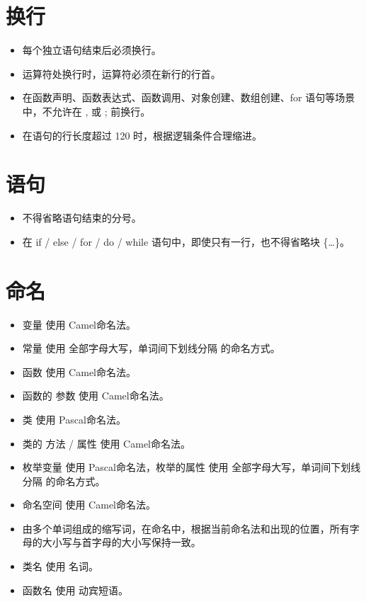 \documentclass[]{report}
\providecommand{\tightlist}{%
  \setlength{\itemsep}{0pt}\setlength{\parskip}{0pt}}
\begin{document}
\hypertarget{ux6362ux884c}{%
\section{换行}\label{ux6362ux884c}}

\begin{itemize}
\tightlist
\item
  每个独立语句结束后必须换行。
\item
  运算符处换行时，运算符必须在新行的行首。
\item
  在函数声明、函数表达式、函数调用、对象创建、数组创建、for
  语句等场景中，不允许在 , 或 ; 前换行。
\item
  在语句的行长度超过 120 时，根据逻辑条件合理缩进。
\end{itemize}

\hypertarget{ux8bedux53e5}{%
\section{语句}\label{ux8bedux53e5}}

\begin{itemize}
\tightlist
\item
  不得省略语句结束的分号。
\item
  在 if / else / for / do / while 语句中，即使只有一行，也不得省略块
  \{\ldots{}\}。
\end{itemize}

\hypertarget{ux547dux540d}{%
\section{命名}\label{ux547dux540d}}

\begin{itemize}
\tightlist
\item
  变量 使用 Camel命名法。
\item
  常量 使用 全部字母大写，单词间下划线分隔 的命名方式。
\item
  函数 使用 Camel命名法。
\item
  函数的 参数 使用 Camel命名法。
\item
  类 使用 Pascal命名法。
\item
  类的 方法 / 属性 使用 Camel命名法。
\item
  枚举变量 使用 Pascal命名法，枚举的属性 使用
  全部字母大写，单词间下划线分隔 的命名方式。
\item
  命名空间 使用 Camel命名法。
\item
  由多个单词组成的缩写词，在命名中，根据当前命名法和出现的位置，所有字母的大小写与首字母的大小写保持一致。
\item
  类名 使用 名词。
\item
  函数名 使用 动宾短语。
\end{itemize}
\end{document}
